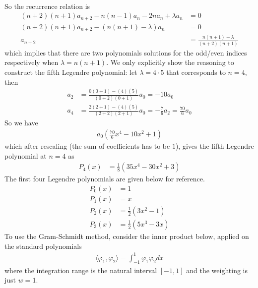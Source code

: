 \begin{Answer}
\begin{align*}
\end{align*}
So the recurrence relation is
\begin{align*}
(n+2)(n+1) a_{n+2} - n(n-1) a_n - 2n a_n + \lambda a_n &= 0 \\
(n+2)(n+1) a_{n+2} - (n(n+1)-\lambda) a_n &= 0 \\
a_{n+2} &= \frac{n(n+1)-\lambda}{(n+2)(n+1)}
\end{align*}
which implies that there are two polynomials solutions for the odd/even indices respectively when $\lambda = n(n+1)$. We only explicitly show the reasoning to construct the fifth Legendre polynomial: let $\lambda = 4 \cdot 5$ that corresponds to $n=4$, then
\begin{align*}
a_{2} &= \frac{0(0+1)-(4)(5)}{(0+2)(0+1)}a_0 = -10a_0 \\
a_{4} &= \frac{2(2+1)-(4)(5)}{(2+2)(2+1)}a_0 = -\frac{7}{6}a_2 = \frac{70}{6}a_0
\end{align*}
So we have
\begin{align*}
a_0\left(\frac{70}{6}x^4 - 10x^2 + 1\right)
\end{align*}
which after rescaling (the sum of coefficients has to be $1$), gives the fifth Legendre polynomial at $n=4$ as
\begin{align*}
P_4(x) &= \frac{1}{8}(35x^4 - 30x^2 + 3)
\end{align*}
The first four Legendre polynomials are given below for reference.
\begin{align*}
P_0(x) &= 1 \\
P_1(x) &= x \\
P_2(x) &= \frac{1}{2}(3x^2 - 1) \\
P_3(x) &= \frac{1}{2}(5x^3 - 3x)
\end{align*}
To use the Gram-Schmidt method, consider the inner product below, applied on the standard polynomials
\begin{align*}
\langle \varphi_1, \varphi_2 \rangle = \int_{-1}^{1} \varphi_1\varphi_2 dx
\end{align*}
where the integration range is the natural interval $[-1,1]$ and the weighting is just $w = 1$.
\end{Answer}